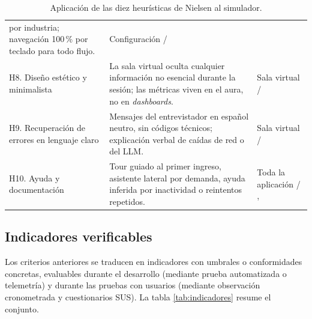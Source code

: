 \begin{table}[ht]
\begin{tabularx}{\linewidth}{@{}p{4.5cm} Y l@{}}
por industria; navegación 100\,\% por teclado para todo flujo. &
Configuración /  \\
\addlinespace
H8. Diseño estético y minimalista &
La sala virtual oculta cualquier información no esencial durante la
sesión; las métricas viven en el aura, no en \textit{dashboards}. &
Sala virtual /  \\
\addlinespace
H9. Recuperación de errores en lenguaje claro &
Mensajes del entrevistador en español neutro, sin códigos técnicos;
explicación verbal de caídas de red o del LLM. &
Sala virtual /  \\
\addlinespace
H10. Ayuda y documentación &
Tour guiado al primer ingreso, asistente lateral por demanda,
ayuda inferida por inactividad o reintentos repetidos. &
Toda la aplicación / ,  \\
\bottomrule
\end{tabularx}
\caption{Aplicación de las diez heurísticas de Nielsen al simulador.}
\label{tab:heuristicas}
\end{table}

\subsection{Indicadores verificables}

Los criterios anteriores se traducen en indicadores con umbrales o
conformidades concretas, evaluables durante el desarrollo (mediante
prueba automatizada o telemetría) y durante las pruebas con usuarios
(mediante observación cronometrada y cuestionarios SUS). La tabla
\ref{tab:indicadores} resume el conjunto.

